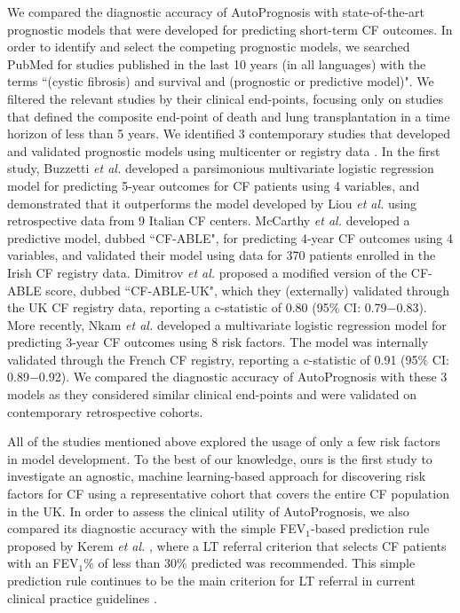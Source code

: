 \documentclass [PhD] {uclathes}
\begin{document}
We compared the diagnostic accuracy of AutoPrognosis with state-of-the-art prognostic models that were developed for predicting short-term CF outcomes. In order to identify and select the competing prognostic models, we searched PubMed for studies published in the last 10 years (in all languages) with the terms ``(cystic fibrosis) and survival and (prognostic or predictive model)". We filtered the relevant studies by their clinical end-points, focusing only on studies that defined the composite end-point of death and lung transplantation in a time horizon of less than 5 years. We identified 3 contemporary studies that developed and validated prognostic models using multicenter or registry data \cite{nkam20173,mccarthy2013cf,dimitrov2015cf,buzzetti2012validation}. In the first study, Buzzetti {\it et al.} \cite{buzzetti2012validation} developed a parsimonious multivariate logistic regression model for predicting 5-year outcomes for CF patients using 4 variables, and demonstrated that it outperforms the model developed by Liou {\it et al.} \cite{liou2001predictive} using retrospective data from 9 Italian CF centers. McCarthy {\it et al.} \cite{mccarthy2013cf} developed a predictive model, dubbed ``CF-ABLE", for predicting 4-year CF outcomes using 4 variables, and validated their model using data for 370 patients enrolled in the Irish CF registry data. Dimitrov {\it et al.} \cite{dimitrov2015cf} proposed a modified version of the CF-ABLE score, dubbed ``CF-ABLE-UK", which they (externally) validated through the UK CF registry data, reporting a c-statistic of 0.80 (95$\%$ CI: 0.79$-$0.83). More recently, Nkam {\it et al.} \cite{nkam20173} developed a multivariate logistic regression model for predicting 3-year CF outcomes using 8 risk factors. The model was internally validated through the French CF registry, reporting a c-statistic of 0.91 (95$\%$ CI: 0.89$-$0.92). We compared the diagnostic accuracy of AutoPrognosis with these 3 models as they considered similar clinical end-points and were validated on contemporary retrospective cohorts. 

All of the studies mentioned above explored the usage of only a few risk factors in model development. To the best of our knowledge, ours is the first study to investigate an agnostic, machine learning-based approach for discovering risk factors for CF using a representative cohort that covers the entire CF population in the UK. In order to assess the clinical utility of AutoPrognosis, we also compared its diagnostic accuracy with the simple FEV$_1$-based prediction rule proposed by Kerem {\it et al.} \cite{kerem1992prediction}, where a LT referral criterion that selects CF patients with an FEV$_1\%$ of less than 30$\%$ predicted was recommended. This simple prediction rule continues to be the main criterion for LT referral in current clinical practice guidelines \cite{hirche2014practical,hook2012selecting,orens2006international}. 
\end{document}
